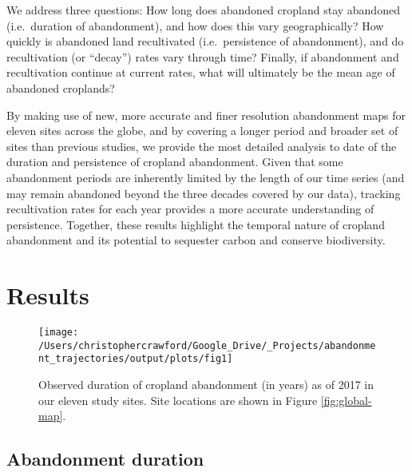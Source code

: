 \documentclass[9pt,twocolumn,twoside,]{pnas-new}
\begin{document}
We address three questions: How long does abandoned cropland stay abandoned (i.e.~duration of abandonment), and how does this vary geographically?
How quickly is abandoned land recultivated (i.e.~persistence of abandonment), and do recultivation (or ``decay'') rates vary through time?
Finally, if abandonment and recultivation continue at current rates, what will ultimately be the mean age of abandoned croplands?

By making use of new, more accurate and finer resolution abandonment maps for eleven sites across the globe, and by covering a longer period and broader set of sites than previous studies, we provide the most detailed analysis to date of the duration and persistence of cropland abandonment.
Given that some abandonment periods are inherently limited by the length of our time series (and may remain abandoned beyond the three decades covered by our data), tracking recultivation rates for each year provides a more accurate understanding of persistence.
Together, these results highlight the temporal nature of cropland abandonment and its potential to sequester carbon and conserve biodiversity.

\hypertarget{results}{%
\section{Results}\label{results}}



\begin{figure*}
\texttt{[image: /Users/christophercrawford/Google\_Drive/\_Projects/abandonment\_trajectories/output/plots/fig1]} \caption{Observed duration of cropland abandonment (in years) as of 2017 in our eleven study sites. Site locations are shown in Figure \ref{fig:global-map}.}\label{fig:maps-abn-duration}
\end{figure*}

\hypertarget{abandonment-duration}{%
\subsection{Abandonment duration}\label{abandonment-duration}}
\end{document}
